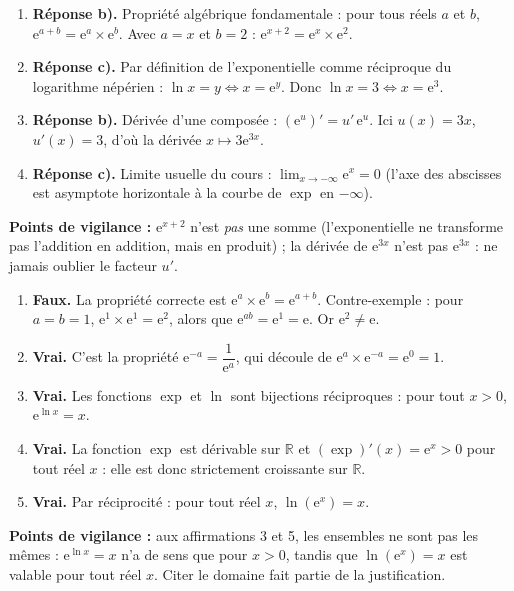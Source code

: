 \documentclass[11pt]{article}
\begin{document}
\begin{corrige}
\begin{enumerate}
\item \textbf{Réponse b).} Propriété algébrique fondamentale : pour tous réels $a$ et $b$, $\mathrm{e}^{a+b} = \mathrm{e}^{a}\times\mathrm{e}^{b}$. Avec $a=x$ et $b=2$ : $\mathrm{e}^{x+2} = \mathrm{e}^{x}\times\mathrm{e}^{2}$.
\item \textbf{Réponse c).} Par définition de l'exponentielle comme réciproque du logarithme népérien : $\ln x = y \iff x = \mathrm{e}^{y}$. Donc $\ln x = 3 \iff x = \mathrm{e}^{3}$.
\item \textbf{Réponse b).} Dérivée d'une composée : $\left(\mathrm{e}^{u}\right)' = u'\,\mathrm{e}^{u}$. Ici $u(x)=3x$, $u'(x)=3$, d'où la dérivée $x \longmapsto 3\mathrm{e}^{3x}$.
\item \textbf{Réponse c).} Limite usuelle du cours : $\displaystyle\lim_{x \to -\infty} \mathrm{e}^{x} = 0$ (l'axe des abscisses est asymptote horizontale à la courbe de $\exp$ en $-\infty$).
\end{enumerate}
\textbf{Points de vigilance :} $\mathrm{e}^{x+2}$ n'est \emph{pas} une somme (l'exponentielle ne transforme pas l'addition en addition, mais en produit) ; la dérivée de $\mathrm{e}^{3x}$ n'est pas $\mathrm{e}^{3x}$ : ne jamais oublier le facteur $u'$.
\end{corrige}

\begin{corrige}
\begin{enumerate}
\item \textbf{Faux.} La propriété correcte est $\mathrm{e}^{a}\times\mathrm{e}^{b} = \mathrm{e}^{a+b}$. Contre-exemple : pour $a=b=1$, $\mathrm{e}^{1}\times\mathrm{e}^{1} = \mathrm{e}^{2}$, alors que $\mathrm{e}^{ab} = \mathrm{e}^{1} = \mathrm{e}$. Or $\mathrm{e}^{2} \neq \mathrm{e}$.
\item \textbf{Vrai.} C'est la propriété $\mathrm{e}^{-a} = \dfrac{1}{\mathrm{e}^{a}}$, qui découle de $\mathrm{e}^{a}\times\mathrm{e}^{-a} = \mathrm{e}^{0} = 1$.
\item \textbf{Vrai.} Les fonctions $\exp$ et $\ln$ sont bijections réciproques : pour tout $x > 0$, $\mathrm{e}^{\ln x} = x$.
\item \textbf{Vrai.} La fonction $\exp$ est dérivable sur $\mathbb{R}$ et $(\exp)'(x) = \mathrm{e}^{x} > 0$ pour tout réel $x$ : elle est donc strictement croissante sur $\mathbb{R}$.
\item \textbf{Vrai.} Par réciprocité : pour tout réel $x$, $\ln\left(\mathrm{e}^{x}\right) = x$.
\end{enumerate}
\textbf{Points de vigilance :} aux affirmations 3 et 5, les ensembles ne sont pas les mêmes : $\mathrm{e}^{\ln x} = x$ n'a de sens que pour $x > 0$, tandis que $\ln(\mathrm{e}^{x}) = x$ est valable pour tout réel $x$. Citer le domaine fait partie de la justification.
\end{corrige}
\end{document}
